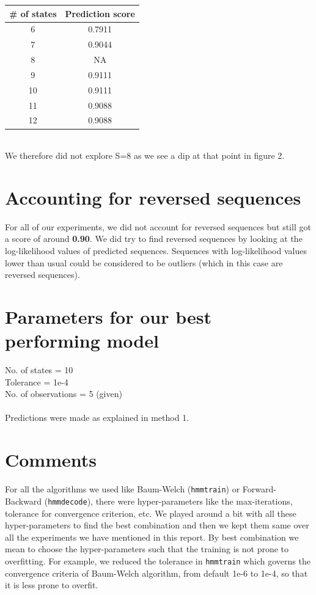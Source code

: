 \documentclass[12pt]{article}
\begin{document}
\begin{center}
\begin{tabular}{|c|c|}
\hline
\textbf{\# of states}     & \textbf{Prediction score} \\ \hline
6   & 0.7911        \\ \hline
7   & 0.9044        \\ \hline
8   & NA            \\ \hline
9   & 0.9111        \\ \hline
10  & 0.9111        \\ \hline
11  & 0.9088        \\ \hline
12  & 0.9088        \\ \hline
\end{tabular}
\end{center}
\\
We therefore did not explore S=8 as we see a dip at that point in figure 2. 

\section*{Accounting for reversed sequences}
For all of our experiments, we did not account for reversed sequences but still got a score of around \textbf{ 0.90}. We did try to find reversed sequences by looking at the log-likelihood values of predicted sequences. Sequences with log-likelihood values lower than usual could be considered to be outliers (which in this case are reversed sequences). 

\section*{Parameters for our best performing model}

No. of states       = 10 \\
Tolerance           = 1e-4 \\
No. of observations = 5 (given)\\
\\
Predictions were made as explained in method 1. 

\section*{Comments}
For all the algorithms we used like Baum-Welch (\verb|hmmtrain|) or Forward-Backward (\verb|hmmdecode|), there were hyper-parameters like the max-iterations, tolerance for convergence criterion, etc. We played around a bit with all these hyper-parameters to find the best combination and then we kept them same over all the experiments we have mentioned in this report. By best combination we mean to choose the hyper-parameters such that the training is not prone to overfitting. For example, we reduced the tolerance in \verb|hmmtrain| which governs the convergence criteria of Baum-Welch algorithm, from default 1e-6 to 1e-4, so that it is less prone to overfit.
\end{document}
